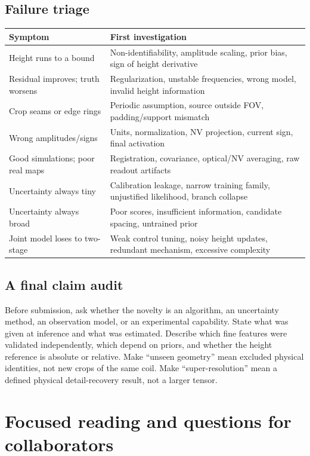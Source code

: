 \subsection{Failure triage}
\begin{tabularx}{\linewidth}{P{42mm}Y}
\toprule Symptom & First investigation\\\midrule
Height runs to a bound & Non-identifiability, amplitude scaling, prior bias, sign of height derivative\\
Residual improves; truth worsens & Regularization, unstable frequencies, wrong model, invalid height information\\
Crop seams or edge rings & Periodic assumption, source outside FOV, padding/support mismatch\\
Wrong amplitudes/signs & Units, normalization, NV projection, current sign, final activation\\
Good simulations; poor real maps & Registration, covariance, optical/NV averaging, raw readout artifacts\\
Uncertainty always tiny & Calibration leakage, narrow training family, unjustified likelihood, branch collapse\\
Uncertainty always broad & Poor scores, insufficient information, candidate spacing, untrained prior\\
Joint model loses to two-stage & Weak control tuning, noisy height updates, redundant mechanism, excessive complexity\\\bottomrule
\end{tabularx}

\subsection{A final claim audit}
Before submission, ask whether the novelty is an algorithm, an uncertainty method, an observation model, or an experimental capability. State what was given at inference and what was estimated. Describe which fine features were validated independently, which depend on priors, and whether the height reference is absolute or relative. Make ``unseen geometry'' mean excluded physical identities, not new crops of the same coil. Make ``super-resolution'' mean a defined physical detail-recovery result, not a larger tensor.

\section{Focused reading and questions for collaborators}

